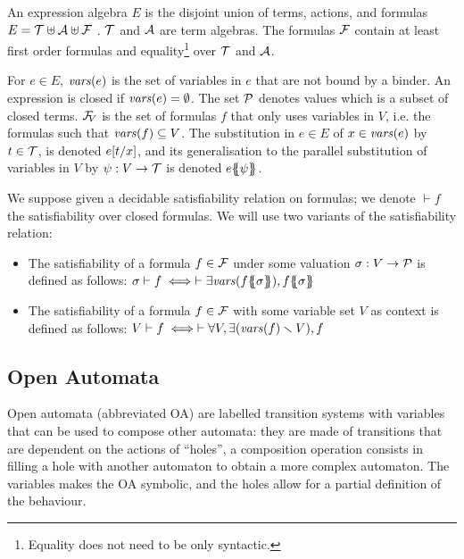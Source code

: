 \documentclass[runningheads]{llncs}
\begin{document}
An expression algebra \(E\) is the disjoint union  of  terms,  actions, and  formulas
\( E=\terms \uplus \actions \uplus \formulas\) .
\(\terms\) and \(\actions\) are term algebras.
The formulas \(\formulas\) contain at least first order formulas and equality\footnote{Equality does not need to be only syntactic.} over \(\terms\) and \(\actions\). 

For \(e \in E\),
 \(\fvars{e}\) is the set of variables in  $e$ that are not bound by a binder. An expression is closed if \(\fvars{e}=\emptyset\).
The set \(\values\) denotes values which is a subset of closed terms. \(\rformulas[V]\) is the set of formulas $f$ that only uses variables in $V$, i.e. the formulas such that  \(\fvars{f}\subseteq V\).
The substitution in \(e \in E\) of \(x \in \fvars{e}\) by \(t \in \terms\), is denoted \(e\subst{t}{x}\), and its generalisation to the parallel substitution of variables in \(V\) by \(\psi: V \to \terms\) is denoted \(e\psubst{\psi}\).


 We suppose given a decidable satisfiability relation on formulas; we denote \({\vdash} f\) the satisfiability over closed formulas.
We will use two variants of the satisfiability relation:
\begin{itemize}
\item The satisfiability of a formula \(f \in \formulas\) under some valuation \(\sigma: V \to \values\) is defined as follows:
\( \sigma \vdash f \iff \vdash \exists \fvars{f\psubst{\sigma}}, f\psubst{\sigma} \)
\item The satisfiability of a formula \(f \in \formulas\) with some variable set \(V\) as context is defined as follows:
\( V \vdash f \iff  \vdash \forall V, \exists\mpar{\fvars{f} \setminus V}, f \)
\end{itemize}


\subsection{Open Automata}\label{sec:def}
 Open automata (abbreviated OA) are labelled transition systems with variables  that can be used to compose other automata: they are made of transitions that are dependent on the actions of ``holes'', a composition operation consists in filling a hole with another automaton to obtain a more complex automaton. The variables makes the OA symbolic, and the holes allow for a partial definition of the behaviour.
\end{document}
